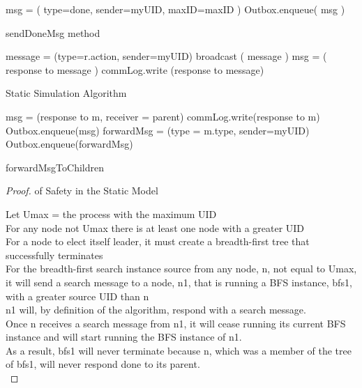 \documentclass[english]{article}
\begin{document}
\begin{algorithm} [sendDoneMsg]
  msg = ( type=done, sender=myUID, maxID=maxID ) \;
  Outbox.enqueue( msg ) \;
  \caption{sendDoneMsg method}
\end{algorithm}

\begin{algorithm} 
   {
     {
      message = (type=r.action, sender=myUID) \;
      broadcast ( message ) \;
      msg = ( response to message ) \;
      commLog.write (response to message) \;
    }
  }
  \caption{Static Simulation Algorithm}
\end{algorithm}

\begin{algorithm} [forwardMsgToChildren]
  msg = (response to m, receiver = parent) \;
  commLog.write(response to m) \;
   {
    Outbox.enqueue(msg) \;
  } { %
    forwardMsg = (type = m.type, sender=myUID) \;
    Outbox.enqueue(forwardMsg) \;
  }
  \caption{forwardMsgToChildren}
\end{algorithm}


\begin{proof} of Safety in the Static Model

  Let Umax = the process with the maximum UID  \\
  For any node not Umax there is at least one node with a greater UID \\
  For a node to elect itself leader, it must create a breadth-first tree that successfully terminates \\
  For the breadth-first search instance source from any node, n, not equal to Umax, it will send a search message to a node, n1, that is running a BFS instance, bfs1, with a  greater source UID than n \\
  n1 will, by definition of the algorithm, respond with a search message. \\
  Once n receives a search message from n1, it will cease running its current BFS instance and will start running the BFS instance of n1. \\
  As a result, bfs1 will never terminate because n, which was a member of the tree of bfs1, will never respond done to its parent. \\

\end{proof}
\end{document}
